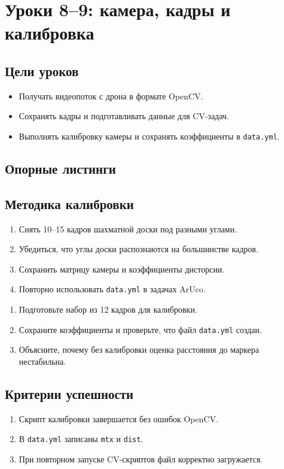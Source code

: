\section{Уроки 8--9: камера, кадры и калибровка}

\subsection{Цели уроков}
\begin{itemize}
\item Получать видеопоток с дрона в формате OpenCV.
\item Сохранять кадры и подготавливать данные для CV-задач.
\item Выполнять калибровку камеры и сохранять коэффициенты в \texttt{data.yml}.
\end{itemize}

\subsection{Опорные листинги}




\subsection{Методика калибровки}
\begin{enumerate}
\item Снять 10--15 кадров шахматной доски под разными углами.
\item Убедиться, что углы доски распознаются на большинстве кадров.
\item Сохранить матрицу камеры и коэффициенты дисторсии.
\item Повторно использовать \texttt{data.yml} в задачах ArUco.
\end{enumerate}

\begin{taskbox}
\begin{enumerate}
\item Подготовьте набор из 12 кадров для калибровки.
\item Сохраните коэффициенты и проверьте, что файл \texttt{data.yml} создан.
\item Объясните, почему без калибровки оценка расстояния до маркера нестабильна.
\end{enumerate}
\end{taskbox}

\subsection{Критерии успешности}
\begin{enumerate}
\item Скрипт калибровки завершается без ошибок OpenCV.
\item В \texttt{data.yml} записаны \texttt{mtx} и \texttt{dist}.
\item При повторном запуске CV-скриптов файл корректно загружается.
\end{enumerate}
